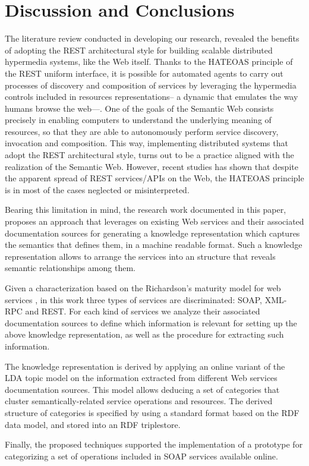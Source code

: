 \section{Discussion and Conclusions}
\label{sec:discussion_conclusions}

\noindent The literature review conducted in developing our research, revealed the benefits of adopting the REST architectural style for building scalable distributed hypermedia systems, like the Web itself. Thanks to the HATEOAS principle of the REST uniform interface, it is possible for automated agents to carry out processes of discovery and composition of services by leveraging the hypermedia controls included in resources representations-- a dynamic that emulates the way humans browse the web---. One of the goals of the Semantic Web consists precisely in enabling computers to understand the underlying meaning of resources, so that they are able to autonomously perform service discovery, invocation and composition. This way, implementing distributed systems that adopt the REST architectural style, turns out to be a practice aligned with the realization of the Semantic Web. However, recent studies has shown that despite the apparent spread of REST services/APIs on the Web, the HATEOAS principle is in most of the cases neglected or misinterpreted.

Bearing this limitation in mind, the research work documented in this paper, proposes an approach that leverages on existing Web services and their associated documentation sources for generating a knowledge representation which captures the semantics that defines them, in a machine readable format. Such a knowledge representation allows to arrange the services into an structure that reveals semantic relationships among them.

Given a characterization based on the Richardson's maturity model for web services \cite{Richardson:2008}, in this work three types of services are discriminated: SOAP, XML-RPC and REST. For each kind of services we analyze their associated documentation sources to define which information is relevant for setting up the above knowledge representation, as well as the procedure for extracting such information.

The knowledge representation is derived by applying an online variant of the LDA topic model on the information extracted from different Web services documentation sources. This model allows deducing a set of categories that cluster semantically-related service operations and resources. The derived structure of categories is specified by using a standard format based on the RDF data model, and stored into an RDF triplestore.

Finally, the proposed techniques supported the implementation of a prototype for categorizing a set of operations included in SOAP services available online. %